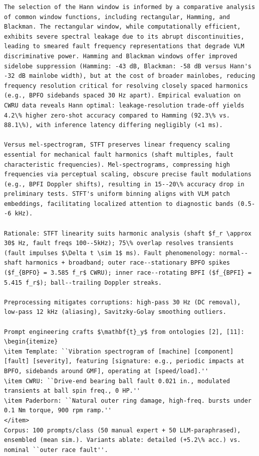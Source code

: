 \begin{verbatim}
The selection of the Hann window is informed by a comparative analysis of common window functions, including rectangular, Hamming, and Blackman. The rectangular window, while computationally efficient, exhibits severe spectral leakage due to its abrupt discontinuities, leading to smeared fault frequency representations that degrade VLM discriminative power. Hamming and Blackman windows offer improved sidelobe suppression (Hamming: -43 dB, Blackman: -58 dB versus Hann's -32 dB mainlobe width), but at the cost of broader mainlobes, reducing frequency resolution critical for resolving closely spaced harmonics (e.g., BPFO sidebands spaced 30 Hz apart). Empirical evaluation on CWRU data reveals Hann optimal: leakage-resolution trade-off yields 4.2\% higher zero-shot accuracy compared to Hamming (92.3\% vs. 88.1\%), with inference latency differing negligibly (<1 ms).

Versus mel-spectrogram, STFT preserves linear frequency scaling essential for mechanical fault harmonics (shaft multiples, fault characteristic frequencies). Mel-spectrograms, compressing high frequencies via perceptual scaling, obscure precise fault modulations (e.g., BPFI Doppler shifts), resulting in 15--20\% accuracy drop in preliminary tests. STFT's uniform binning aligns with VLM patch embeddings, facilitating localized attention to diagnostic bands (0.5--6 kHz).

Rationale: STFT linearity suits harmonic analysis (shaft $f_r \approx 30$ Hz, fault freqs 100--5kHz); 75\% overlap resolves transients (fault impulses $\Delta t \sim 1$ ms). Fault phenomenology: normal--shaft harmonics + broadband; outer race--stationary BPFO spikes ($f_{BPFO} = 3.585 f_r$ CWRU); inner race--rotating BPFI ($f_{BPFI} = 5.415 f_r$); ball--trailing Doppler streaks.

Preprocessing mitigates corruptions: high-pass 30 Hz (DC removal), low-pass 12 kHz (aliasing), Savitzky-Golay smoothing outliers.

Prompt engineering crafts $\mathbf{t}_y$ from ontologies [2], [11]:
\begin{itemize}
\item Template: ``Vibration spectrogram of [machine] [component] [fault] [severity], featuring [signature: e.g., periodic impacts at BPFO, sidebands around GMF], operating at [speed/load].''
\item CWRU: ``Drive-end bearing ball fault 0.021 in., modulated transients at ball spin freq., 0 HP.''
\item Paderborn: ``Natural outer ring damage, high-freq. bursts under 0.1 Nm torque, 900 rpm ramp.''
</item>
Corpus: 100 prompts/class (50 manual expert + 50 LLM-paraphrased), ensembled (mean sim.). Variants ablate: detailed (+5.2\% acc.) vs. nominal ``outer race fault''.


\end{verbatim}
